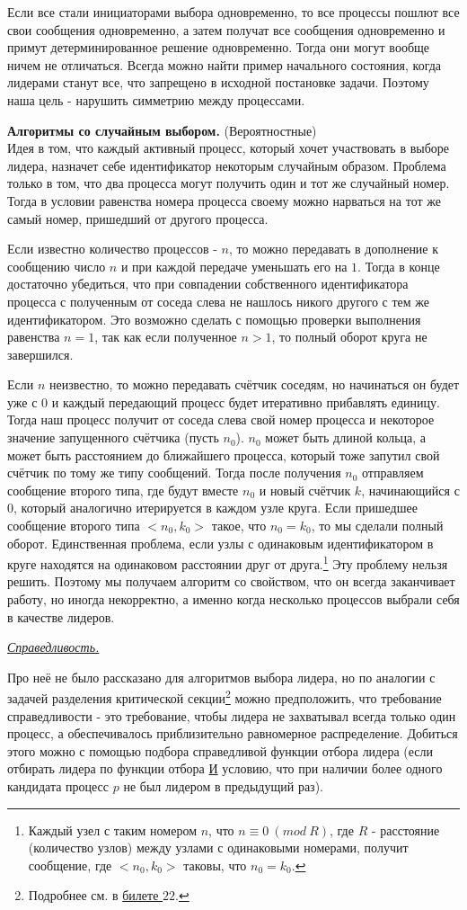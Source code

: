 Если все стали инициаторами выбора одновременно, то все процессы пошлют все свои сообщения одновременно, а затем получат все сообщения одновременно и примут детерминированное решение одновременно. Тогда они могут вообще ничем не отличаться. Всегда можно найти пример начального состояния, когда лидерами станут все, что запрещено в исходной постановке задачи. Поэтому наша цель - нарушить симметрию между процессами.

\textbf{Алгоритмы со случайным выбором.} (Вероятностные)\\
Идея в том, что каждый активный процесс, который хочет участвовать в выборе лидера, назначет себе идентификатор некоторым случайным образом.
Проблема только в том, что два процесса могут получить один и тот же случайный номер. Тогда в условии равенства номера процесса своему можно нарваться на тот же самый номер, пришедший от другого процесса.

Если известно количество  процессов - $n$, то можно передавать в дополнение к сообщению число $n$ и при каждой передаче уменьшать его на $1$. Тогда в конце достаточно убедиться, что при совпадении собственного идентификатора процесса с полученным от соседа слева не нашлось никого другого с тем же идентификатором. Это возможно сделать с помощью проверки выполнения равенства $n = 1$, так как если полученное $n > 1$, то полный оборот круга не завершился.

Если $n$ неизвестно, то можно передавать счётчик соседям, но начинаться он будет уже с $0$ и каждый передающий процесс будет итеративно прибавлять единицу. Тогда наш процесс получит от соседа слева свой номер процесса и некоторое значение запущенного счётчика (пусть $n_0$). $n_0$ может быть длиной кольца, а может быть расстоянием до ближайшего процесса, который тоже запутил свой счётчик по тому же типу сообщений. Тогда после получения $n_0$ отправляем сообщение второго типа, где будут вместе $n_0$ и новый счётчик $k$, начинающийся с $0$, который аналогично итерируется в каждом узле круга. Если пришедшее сообщение второго типа $<n_0, k_0>$ такое, что $n_0 = k_0$, то мы сделали полный оборот. Единственная проблема, если узлы с одинаковым идентификатором в круге находятся на одинаковом расстоянии друг от друга.\footnote{Каждый узел с таким номером $n$, что $n \equiv 0\ (mod\ R)$, где $R$ - расстояние (количество узлов) между узлами с одинаковыми номерами, получит  сообщение, где $<n_0, k_0>$ таковы, что $n_0 = k_0$.}
Эту проблему нельзя решить. Поэтому мы получаем алгоритм со свойством, что он всегда заканчивает работу, но иногда некорректно, а именно когда несколько процессов выбрали себя в качестве лидеров.
\begin{center}
    \textit{\underline{Справедливость.}}
\end{center}
Про неё не было рассказано для алгоритмов выбора лидера, но по аналогии с задачей разделения критической секции\footnote{Подробнее см. в \hyperlink{b_22_link}{билете $22$}.} можно предположить, что требование справедливости - это требование, чтобы лидера не захватывал всегда только один процесс, а обеспечивалось
приблизительно равномерное распределение. Добиться этого можно с помощью подбора справедливой функции отбора лидера (если отбирать лидера по функции отбора \underline{И} условию, что при наличии более одного кандидата процесс $p$ не был лидером в предыдущий раз).
